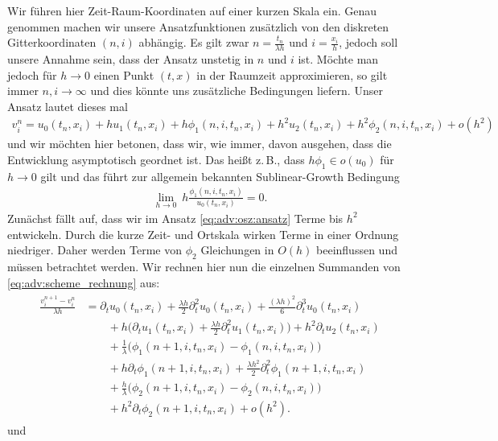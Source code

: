 Wir führen hier Zeit-Raum-Koordinaten auf einer kurzen Skala ein.
Genau genommen machen wir unsere Ansatzfunktionen zusätzlich von den diskreten Gitterkoordinaten $(n,i)$ abhängig.
Es gilt zwar $n = \frac {t_n} {\lambda h}$ und $i = \frac {x_i}{h}$, jedoch soll unsere Annahme sein, dass der Ansatz unstetig in $n$ und $i$ ist.
Möchte man jedoch für $h \to 0$ einen Punkt $(t,x)$ in der Raumzeit approximieren, so gilt immer $n,i \to \infty$ und dies könnte uns zusätzliche Bedingungen liefern.
Unser Ansatz lautet dieses mal
\begin{align}\label{eq:adv:osz:ansatz}
v^n_i = u_0(t_n, x_i) + h u_1(t_n, x_i) +  h \phi_1(n, i, t_n, x_i) + h^2 u_2(t_n, x_i) + h^2 \phi_2(n, i, t_n, x_i) + o(h^2)
\end{align}
und wir möchten hier betonen, dass wir, wie immer, davon ausgehen, dass die Entwicklung asymptotisch geordnet ist.
Das heißt z.\,B., dass $h \phi_1 \in o(u_0)$ für $h \to 0$ gilt und das führt zur allgemein bekannten Sublinear-Growth Bedingung
\begin{align}\label{eq:osz:sublineargrowth}
\lim_{h \to 0} \: h \frac{\phi_1(n, i, t_n, x_i)}{u_0(t_n, x_i)} = 0.
\end{align}
Zunächst fällt auf, dass wir im Ansatz \eqref{eq:adv:osz:ansatz} Terme bis $h^2$ entwickeln.
Durch die kurze Zeit- und Ortskala wirken Terme in einer Ordnung niedriger.
Daher werden Terme von $\phi_2$ Gleichungen in $O(h)$ beeinflussen und müssen betrachtet werden.
Wir rechnen hier nun die einzelnen Summanden von \eqref{eq:adv:scheme_rechnung} aus:
{\small
\begin{align} \label{eq:adv:osz:diff1}
\begin{split}
\frac {v^{n+1}_i - v^n_i} {\lambda h}
&= \partial_t u_0(t_n, x_i) + \frac {\lambda h}{2} \partial^2_t u_0(t_n, x_i) + \frac {(\lambda h)^2}{6} \partial^3_t u_0(t_n, x_i)\\
&\qquad + h \bigl( \partial_t u_1(t_n, x_i) + \frac {\lambda h}{2} \partial^2_t u_1(t_n, x_i) \bigr) + h^2 \partial_t u_2(t_n, x_i)\\
&\qquad + \frac 1 \lambda \bigl( \phi_1(n+1, i, t_n, x_i) - \phi_1(n, i, t_n, x_i) \bigr)\\
&\qquad + h \partial_t \phi_1(n+1, i, t_n, x_i) + \frac {\lambda h^2}{2} \partial^2_t \phi_1(n+1, i, t_n, x_i)\\
&\qquad + \frac h \lambda \bigl( \phi_2(n+1, i, t_n, x_i) - \phi_2(n, i, t_n, x_i) \bigr)\\
&\qquad + h^2 \partial_t \phi_2(n+1, i, t_n, x_i) + o(h^2).
\end{split}
\end{align}
} und
